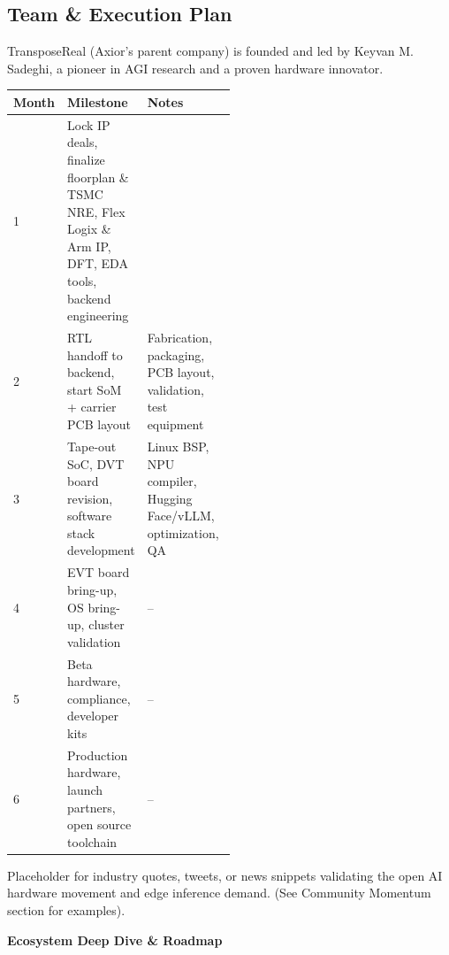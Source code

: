 \documentclass[12pt]{article}
\begin{document}
\begin{multicols}{2}
\vspace{1em}

\subsection{Team \& Execution Plan}
TransposeReal (Axior's parent company) is founded and led by Keyvan M. Sadeghi, a pioneer in AGI research and a proven hardware innovator.
\vspace{0.5em}
\begin{center}
\begin{tabular}{@{} l l p{0.5\linewidth} @{}}
\toprule
\textbf{Month} & \textbf{Milestone} & \textbf{Notes} \\
\midrule
1     & Lock IP deals, finalize floorplan \& TSMC NRE, Flex Logix \& Arm IP, DFT, EDA tools, backend engineering \\
2     & RTL handoff to backend, start SoM + carrier PCB layout & Fabrication, packaging, PCB layout, validation, test equipment \\
3     & Tape-out SoC, DVT board revision, software stack development & Linux BSP, NPU compiler, Hugging Face/vLLM, optimization, QA \\
4     & EVT board bring-up, OS bring-up, cluster validation & -- \\
5     & Beta hardware, compliance, developer kits & -- \\
6     & Production hardware, launch partners, open source toolchain & -- \\
\bottomrule
\end{tabular}
\end{center}

\vspace{1em}

\begin{infobox}[title=Industry Signals]
\scriptsize Placeholder for industry quotes, tweets, or news snippets validating the open AI hardware movement and edge inference demand. (See Community Momentum section for examples).
\end{infobox}

\end{multicols}


\begin{center}
    {\brochuretitle\Huge\bfseries\color{axiorMagenta} Ecosystem Deep Dive \& Roadmap}
\end{center}
\vspace{1em}
\end{document}
